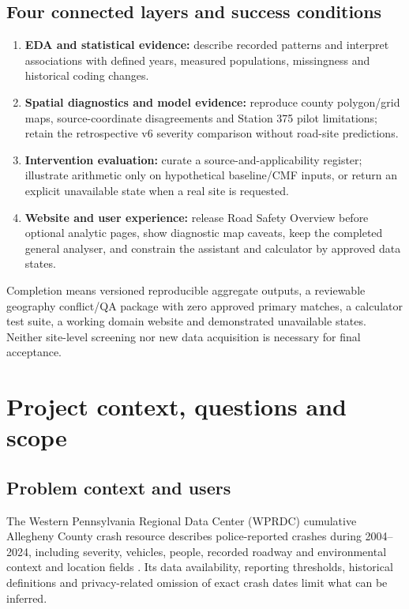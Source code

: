 \documentclass[11pt,a4paper,openany]{report}
\begin{document}
\normalsize

\section{Four connected layers and success conditions}
\begin{enumerate}
\item \textbf{EDA and statistical evidence:} describe recorded patterns and interpret associations with defined years, measured populations, missingness and historical coding changes.
\item \textbf{Spatial diagnostics and model evidence:} reproduce county polygon/grid maps, source-coordinate disagreements and Station 375 pilot limitations; retain the retrospective v6 severity comparison without road-site predictions.
\item \textbf{Intervention evaluation:} curate a source-and-applicability register; illustrate arithmetic only on hypothetical baseline/CMF inputs, or return an explicit unavailable state when a real site is requested.
\item \textbf{Website and user experience:} release Road Safety Overview before optional analytic pages, show diagnostic map caveats, keep the completed general analyser, and constrain the assistant and calculator by approved data states.
\end{enumerate}
Completion means versioned reproducible aggregate outputs, a reviewable geography conflict/QA package with zero approved primary matches, a calculator test suite, a working domain website and demonstrated unavailable states. Neither site-level screening nor new data acquisition is necessary for final acceptance.

\chapter{Project context, questions and scope}
\section{Problem context and users}
The Western Pennsylvania Regional Data Center (WPRDC) cumulative Allegheny County crash resource describes police-reported crashes during 2004--2024, including severity, vehicles, people, recorded roadway and environmental context and location fields \cite{WPRDC}. Its data availability, reporting thresholds, historical definitions and privacy-related omission of exact crash dates limit what can be inferred.
\end{document}
